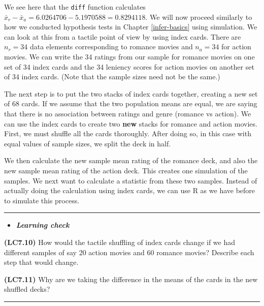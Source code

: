 \documentclass[]{tufte-book}
\newenvironment{Shaded}{\begin{snugshade}}{\end{snugshade}}
\newcommand{\KeywordTok}[1]{\textcolor[rgb]{0.13,0.29,0.53}{\textbf{{#1}}}}
\newcommand{\DataTypeTok}[1]{\textcolor[rgb]{0.13,0.29,0.53}{{#1}}}
\newcommand{\StringTok}[1]{\textcolor[rgb]{0.31,0.60,0.02}{{#1}}}
\newcommand{\NormalTok}[1]{{#1}}
\let\oldrule=\rule
\renewcommand{\rule}[1]{\oldrule{\linewidth}}
\newenvironment{rmdblock}[1]
  {\begin{shaded*}
  \begin{itemize}
  \renewcommand{\labelitemi}{
    \raisebox{-.7\height}[0pt][0pt]{
    }
  }
  \item
  }
  {
  \end{itemize}
  \end{shaded*}
  }
\newenvironment{learncheck}
  {\begin{rmdblock}{warning}}
  {\end{rmdblock}}
\begin{document}
We see here that the \texttt{diff} function calculates
\(\bar{x}_r - \bar{x}_a = 6.0264706 - 5.1970588 = 0.8294118\). We will
now proceed similarly to how we conducted hypothesis tests in Chapter
\ref{infer-basics} using simulation. We can look at this from a tactile
point of view by using index cards. There are \(n_r = 34\) data elements
corresponding to romance movies and \(n_a = 34\) for action movies. We
can write the 34 ratings from our sample for romance movies on one set
of 34 index cards and the 34 leniency scores for action movies on
another set of 34 index cards. (Note that the sample sizes need not be
the same.)

The next step is to put the two stacks of index cards together, creating
a new set of 68 cards. If we assume that the two population means are
equal, we are saying that there is no association between ratings and
genre (romance vs action). We can use the index cards to create two
\textbf{new} stacks for romance and action movies. First, we must
shuffle all the cards thoroughly. After doing so, in this case with
equal values of sample sizes, we split the deck in half.

We then calculate the new sample mean rating of the romance deck, and
also the new sample mean rating of the action deck. This creates one
simulation of the samples. We next want to calculate a statistic from
these two samples. Instead of actually doing the calculation using index
cards, we can use R as we have before to simulate this process.

\begin{center}\rule{0.5\linewidth}{\linethickness}\end{center}

\begin{learncheck}
\textbf{\emph{Learning check}}
\end{learncheck}

\textbf{(LC7.10)} How would the tactile shuffling of index cards change
if we had different samples of say 20 action movies and 60 romance
movies? Describe each step that would change.

\textbf{(LC7.11)} Why are we taking the difference in the means of the
cards in the new shuffled decks?

\begin{center}\rule{0.5\linewidth}{\linethickness}\end{center}

\begin{Shaded}
\end{Shaded}
\end{document}
